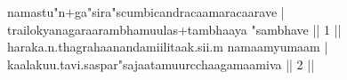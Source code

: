 \documentclass{article}
\begin{document}
namastu"n+ga"sira"scumbicandracaamaracaarave |\\
trailokyanagaraarambhamuulas+tambhaaya "sambhave || 1 ||\\
haraka.n.thagrahaanandamiilitaak.sii.m namaamyumaam |\\
kaalakuu.tavi.saspar"sajaatamuurcchaagamaamiva || 2 ||
\end{document}
